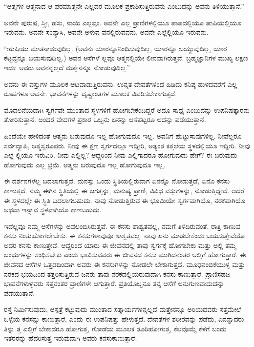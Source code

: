 “ಆತ್ಮಗಳ ಆತ್ಮನಾದ ಆ ಪರಮಾತ್ಮನೇ ಎಲ್ಲದರ ಮೂಲಕ ಪ್ರಕಾಶಿಸುತ್ತಿರುವನು ಎಂಬುದನ್ನು ಅವನು ತಿಳಿಯುತ್ತಾನೆ.”

ಅವನೇ ಪುರುಷ, ಸ್ತ್ರೀ, ಹಸು, ನಾಯಿ ಎಲ್ಲವೂ. ಅವನೇ ಎಲ್ಲ ಪ್ರಾಣಿಗಳಲ್ಲಿಯೂ ಪಾಪದಲ್ಲಿಯೂ ಪಾಪಿಯಲ್ಲಿಯೂ ಇರುವನು. ಅವನೇ ಸಂನ್ಯಾಸಿ, ಅವನೇ ಅಳುವ ವನಲ್ಲಿರುವವನು, ಅವನೇ ಎಲ್ಲೆಲ್ಲಿಯೂ ಇರುವನು.

“ಋಷಿಯು ಮಾತನಾಡುವುದಿಲ್ಲ. (ಅವನು ಯಾರನ್ನೂನಿಂದಿಸುವುದಿಲ್ಲ, ಯಾರನ್ನೂ ಬಯ್ಯುವುದಿಲ್ಲ, ಯಾರ ಕೆಟ್ಟದ್ದನ್ನೂ ಬಯಸುವುದಿಲ್ಲ.) ಅವನ ಆಸೆಗಳೆ ಲ್ಲವೂ ಆತ್ಮನಲ್ಲಿಯೇ ಲೀನವಾಗಿರುತ್ತವೆ. ಬ್ರಹ್ಮಜ್ಞಾನಿಗಳ ಮುಖ್ಯ ಲಕ್ಷಣ ಇದು: ಅವರು ಅವನನ್ನಲ್ಲದೆ ಮತ್ತೇನನ್ನೂ ನೋಡುವುದಿಲ್ಲ.”

ಅವನು ಈ ವಸ್ತುಗಳ ಮೂಲಕ ಆಟವಾಡುತ್ತಿರುವನು. ಉನ್ನತ ದೇವತೆಗಳಿಂದ ಹಿಡಿದು ಕನಿಷ್ಠ ಹುಳದವರೆಗೆ ಎಲ್ಲ ರೂಪಗಳೂ ಅವನೇ. ಭಾವನೆಗಳನ್ನು ದೃಷ್ಟಾಂತಗಳ ಮೂಲಕ ವಿವರಿಸಬೇಕಾಗುತ್ತದೆ.

ಮೊದಲನೆಯದಾಗಿ ಸ್ವರ್ಗವೇ ಮುಂತಾದ ಸ್ಥಳಗಳಿಗೆ ಹೋಗಬೇಕೆಂದಿದ್ದರೆ ಅದೂ ಸಾಧ್ಯ ಎಂಬುದನ್ನು ಉಪನಿಷತ್ಕಾರನು ತೋರಿಸುತ್ತಾನೆ. ಅಂದರೆ ವೇದಗಳ ಪ್ರಕಾರ ಒಬ್ಬನು ಏನನ್ನು ಆಸೆಪಟ್ಟರೂ ಅದನ್ನು ಪಡೆಯುತ್ತಾನೆ.

ಹಿಂದೆಯೇ ಹೇಳಿದಂತೆ ಆತ್ಮನು ಬರುವುದೂ ಇಲ್ಲ ಹೋಗುವುದೂ ಇಲ್ಲ. ಅವನಿಗೆ ಹುಟ್ಟುಸಾವುಗಳಿಲ್ಲ. ನೀವೆಲ್ಲರೂ ಸರ್ವವ್ಯಾಪಿ, ಆತ್ಮಸ್ವರೂಪರು. ನೀವು ಈ ಕ್ಷಣ ಸ್ವರ್ಗದಲ್ಲೂ ಇದ್ದೀರಿ, ಅತ್ಯಂತ ಕತ್ತಲೆಯ ಸ್ಥಳದಲ್ಲಿಯೂ ಇದ್ದೀರಿ. ನೀವು ಎಲ್ಲೆ ಲ್ಲಿಯೂ ಇರುವಿರಿ. ನೀವು ಎಲ್ಲಿಲ್ಲ? ಆದ್ದರಿಂದ ನೀವು ಎಲ್ಲಿಗಾದರೂ ಹೋಗುವುದು ಹೇಗೆ? ಈ ಬರುವುದು ಹೋಗುವುದು ಎಲ್ಲ ಭ್ರಮೆ. ಆತ್ಮನು ಬರುವುದೂ ಇಲ್ಲ ಹೋಗುವುದೂ ಇಲ್ಲ.

ಈ ದರ್ಶನಗಳೆಲ್ಲ ಬದಲಾಗುತ್ತವೆ. ಮನಸ್ಸು ಒಂದು ಸ್ಥಿತಿಯಲ್ಲಿರುವಾಗ ಏನನ್ನೊ ನೋಡುತ್ತದೆ, ಏನೊ ಕನಸು ಕಾಣುತ್ತದೆ. ನಮ್ಮ ಈಗಿನ ಸ್ಥಿತಿಯಲ್ಲಿ ಈ ಜಗತ್ತನ್ನು, ಮನುಷ್ಯ ಪ್ರಾಣಿ, ವಿವಿಧ ವಸ್ತುಗಳನ್ನು, ನೋಡುತ್ತಿದ್ದೇವೆ. ಆದರೆ ಈ ಸ್ಥಳದಲ್ಲೇ ಈ ಸ್ಥಿತಿ ಬದಲಾಗಬಹುದು. ನಾವು ನೋಡುತ್ತಿರುವ ಈ ಭೂಮಿಯೇ ಸ್ವರ್ಗವಾಗಿಯೊ, ನರಕವಾಗಿಯೊ ಅಥವಾ ಇನ್ನಾವ ಸ್ಥಳವಾಗಿಯೊ ಕಾಣಬಹುದು.

ಇದೆಲ್ಲವೂ ನಮ್ಮ ಆಸೆಗಳನ್ನು ಅವಲಂಬಿಸಿರುತ್ತವೆ. ಈ ಕನಸು ಶಾಶ್ವತವಲ್ಲ, ನಮಗೆ ತಿಳಿದಿರುವಂತೆ, ರಾತ್ರಿ ಕಾಣುವ ಕನಸು ನಿಂತುಹೋಗಲೇಬೇಕು. ಈ ಕನಸುಗಳಾವುವೂ ಶಾಶ್ವತವಲ್ಲ. ನಾವು ಏನು ಮಾಡಬೇಕೆಂದು ಬಯಸುತ್ತೇವೆಯೊ ಅದರ ಕನಸು ಕಾಣುತ್ತೇವೆ. ಆದ್ದರಿಂದ ಯಾರು ಈ ಜೀವನದಲ್ಲಿ ತಾವು ಸ್ವರ್ಗಕ್ಕೆ ಹೋಗಬೇಕು ಮತ್ತು ಅಲ್ಲಿ ತಮ್ಮ ಬಂಧುಗಳನ್ನು ಸಂಧಿಸಬೇಕು ಎಂದು ಭಾವಿಸುವವರು ಈ ಜೀವನದ ಕನಸು ಮುಗಿದನಂತರ ಅಲ್ಲಿಗೆ ಹೋಗುತ್ತಾರೆ. ಈ ಜೀವನದ ಆಸೆಗಳ ಒತ್ತಡದಿಂದಾಗಿ ಅವರು ಈ ಕನಸುಗಳನ್ನು ನೋಡಲೇ ಬೇಕಾಗುತ್ತದೆ. ಮೂಢನಂಬಿಕೆಯುಳ್ಳ ಮತ್ತು ನರಕದ ಭಯದಿಂದ ತತ್ತರಿಸುತ್ತಿರುವ ಜನರು ತಾವು ನರಕದಲ್ಲಿಯರುವುದಾಗಿ ಕನಸು ಕಾಣುತ್ತಾರೆ. ಪ್ರಾಣಿಸಹಜ ಭಾವನೆಗಳುಳ್ಳವರು ಸತ್ತನಂತರ ಪ್ರಾಣಿಗಳೇ ಆಗುತ್ತಾರೆ. ಪ್ರತಿಯೊಬ್ಬನೂ ತನ್ನ ಆಸೆಗೆ ಅನುಗುಣವಾದುದನ್ನು ಪಡೆಯುತ್ತಾನೆ.

ರಸ್ತೆ ನಿರ್ಮಿಸುವುದು, ಆಸ್ಪತ್ರೆ ಕಟ್ಟುವುದು ಮುಂತಾದ ಸತ್ಕಾರ್ಯಗಳನ್ನಲ್ಲದೆ ಮತ್ತೇನನ್ನೂ ಅರಿಯದವರು ಸತ್ತಮೇಲೆ ಒಳ್ಳೆಯ ಕನಸನ್ನು ಕಾಣುತ್ತಾರೆ, ಎಂದು ಈ ಉಪನಿಷತ್ತು ಹೇಳುತ್ತದೆ. ದೇವತೆಗಳ ಶರೀರವನ್ನು ಪಡೆದು, ಏನನ್ನಾದರು ತಿನ್ನು ತ್ತ ಎಲ್ಲಿಗೆ ಬೇಕಾದರೂ ಹೋಗುತ್ತ, ಗೋಡೆಯ ಮೂಲಕ ತೂರಿಹೋಗುತ್ತ, ಕೆಲವೊಮ್ಮೆ ಕೆಳಗೆ ಬಂದು ಇತರರನ್ನು ಹೆದರಿಸುತ್ತ ಇರುವುದಾಗಿ ಅವರು ಕನಸುಕಾಣುತ್ತಾರೆ.

